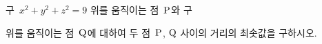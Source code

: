 구~$x^2+y^2+z^2=9$ 위를 움직이는 점~$\mathrm{P}$와 구 \par\smallskip{}\par\smallskip\noindent 위를 움직이는 점~$\mathrm{Q}$에 대하여 두 점~$\mathrm{P}$, $\mathrm{Q}$ 사이의 거리의 최솟값을 구하시오.
